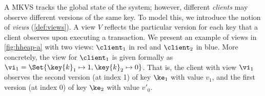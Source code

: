 


A MKVS tracks the global state of the system; however, different \emph{clients} may observe different versions of the same key. 
To model this, we introduce the notion of \emph{views} (\cref{def:views}). 
A view $V$ reflects the particular version for each key that a client observes upon executing a transaction. 
We present an example of views in \cref{fig:hheap-a} with two views: $\client_1$ in red and $\client_2$ in blue.
More concretely, the view for \( \client_1 \) is given formally as $\vi_1 = \Set{\key{k}_1 \mapsto 1, \key{k}_2 \mapsto 0}$.
That is, the client with view $\vi_1$ observes the second version (at index 1) of key \( \ke_{1} \) with value $v_1$, and the first version (at index 0) of key \( \ke_2 \) with value $v'_0$.

